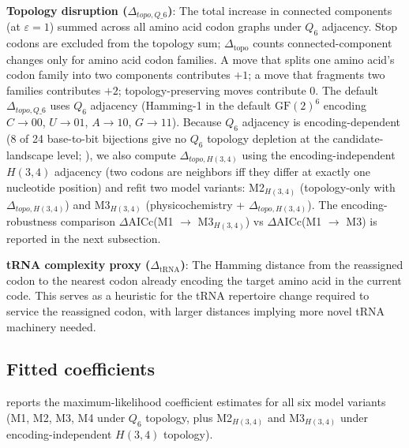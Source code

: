 \documentclass[preprint,11pt,authoryear,a4paper]{elsarticle}
\providecommand{\textsubscript}[1]{\ensuremath{_{\text{#1}}}}
\begin{document}
\textbf{Topology disruption (\(\Delta_{topo,Q\_ 6}\))}: The total
increase in connected components (at \(\varepsilon = 1\)) summed across
all amino acid codon graphs under \(Q_{6}\) adjacency. Stop codons are
excluded from the topology sum; \(\Delta_{\text{topo}}\) counts
connected-component changes only for amino acid codon families. A move
that splits one amino acid's codon family into two components
contributes \(+ 1\); a move that fragments two families contributes
\(+ 2\); topology-preserving moves contribute \(0\). The default
\(\Delta_{topo,Q\_ 6}\) uses \(Q_{6}\) adjacency (Hamming-1 in the
default \({\text{GF}(2)}^{6}\) encoding \(C \rightarrow 00\),
\(U \rightarrow 01\), \(A \rightarrow 10\), \(G \rightarrow 11\)).
Because \(Q_{6}\) adjacency is encoding-dependent (8 of 24 base-to-bit
bijections give no \(Q_{6}\) topology depletion at the
candidate-landscape level; ), we also
compute \(\Delta_{topo,H(3,4)}\) using the encoding-independent
\(H(3,4)\) adjacency (two codons are neighbors iff they differ at
exactly one nucleotide position) and refit two model variants:
M2\textsubscript{\(H(3,4)\)} (topology-only with
\(\Delta_{topo,H(3,4)}\)) and M3\textsubscript{\(H(3,4)\)}
(physicochemistry + \(\Delta_{topo,H(3,4)}\)). The encoding-robustness
comparison \(\Delta\)AICc(M1 \(\rightarrow\)
M3\textsubscript{\(H(3,4)\)}) vs \(\Delta\)AICc(M1 \(\rightarrow\) M3)
is reported in the next subsection.

\textbf{tRNA complexity proxy (\(\Delta_{\text{tRNA}}\))}: The Hamming
distance from the reassigned codon to the nearest codon already encoding
the target amino acid in the current code. This serves as a heuristic
for the tRNA repertoire change required to service the reassigned codon,
with larger distances implying more novel tRNA machinery needed.

\subsection{Fitted coefficients}

 reports the maximum-likelihood coefficient
estimates for all six model variants (M1, M2, M3, M4 under \(Q_{6}\)
topology, plus M2\textsubscript{\(H(3,4)\)} and
M3\textsubscript{\(H(3,4)\)} under encoding-independent \(H(3,4)\)
topology).
\end{document}
